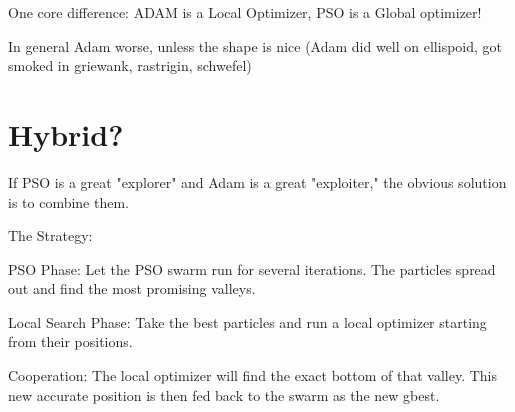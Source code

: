 One core difference: ADAM is a Local Optimizer, PSO is a Global optimizer!

In general Adam worse, unless the shape is nice (Adam did well on ellispoid, got smoked in 
griewank, rastrigin, schwefel)

\section*{Hybrid?}

If PSO is a great "explorer" and Adam is a great "exploiter," the obvious solution is to combine them.
    
The Strategy:
\begin{tightitemize}
    \item PSO Phase: Let the PSO swarm run for several iterations. 
    The particles spread out and find the most promising valleys.
    \item Local Search Phase: 
    Take the best particles and run a local optimizer starting from their positions.
    \item Cooperation: The local optimizer  will find the exact bottom of that valley. 
    This new accurate position is then fed back to the swarm as the new gbest.
\end{tightitemize}
        

        

        